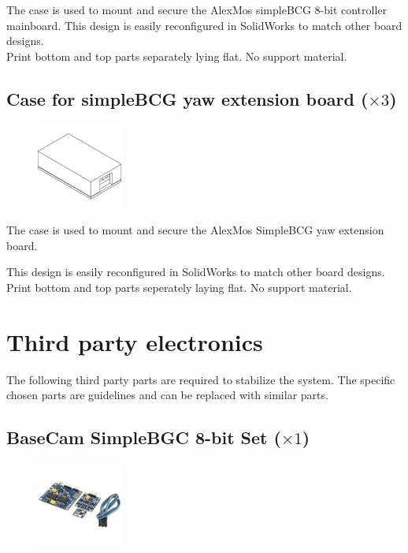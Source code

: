 The case is used to mount and secure the AlexMos simpleBCG 8-bit controller mainboard. This design is easily reconfigured in SolidWorks to match other board designs.\\

\raisebox{-0.2cm}{\hspace{-1.5cm}\Huge\Info}\normalsize \quad
Print bottom and top parts separately lying flat. No support material.


\subsection{Case for simpleBCG yaw extension board ($\times3$)}

\begin{figure}
    \vspace{-1.5cm}
    \includegraphics[width=0.25\textwidth]{PrintedParts/case_yaw_assembly.PNG}
\end{figure}

The case is used to mount and secure the AlexMos SimpleBCG yaw extension board. 

This design is easily reconfigured in SolidWorks to match other board designs.\\

\raisebox{-0.2cm}{\hspace{-1.5cm}\Huge\Info}\normalsize \quad
Print bottom and top parts seperately laying flat. No support material.\\


\section{Third party electronics}
The following third party parts are required to stabilize the system. The specific chosen parts are guidelines and can be replaced with similar parts.

\subsection{BaseCam SimpleBGC 8-bit Set ($\times1$)}

\begin{figure}
    \vspace{-1.5cm}
    \includegraphics[width=0.25\textwidth]{ThirdParts/SimpleBGC.jpg}
\end{figure}

